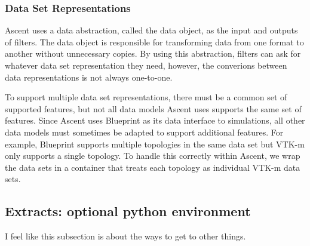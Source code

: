 \subsubsection{Data Set Representations}
Ascent uses a data abstraction, called the data object, as the input
and outputs of filters.
%
The data object is responsible for transforming data from one format
to another without unnecessary copies.
%
By using this abstraction, filters can ask for whatever data set
representation they need, however, the converions between data
representations is not always one-to-one.
%

To support multiple data set representations, there must be a common
set of supported features, but not all data models Ascent uses
supports the same set of features.
%
Since Ascent uses Blueprint as its data interface to simulations,
all other data models must sometimes be adapted to support additional
features.
%
For example, Blueprint supports multiple topologies in the same data set
but VTK-m only supports a single topology.
%
To handle this correctly within Ascent, we wrap the data sets in a container
that treats each topology as individual VTK-m data sets.
%

\subsection{Extracts: optional python environment}
I feel like this subsection is about the ways to get to other things.
